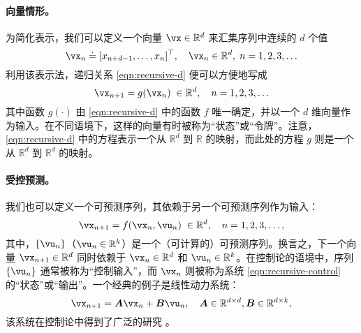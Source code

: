\documentclass[../../book-main_zh.tex]{subfiles}
\begin{document}
\paragraph{向量情形。} 
为简化表示，我们可以定义一个向量 $\vx \in \mathbb{R}^d$ 来汇集序列中连续的 $d$ 个值
\begin{equation}
    \vx_n \doteq [x_{n+d-1}, \ldots,  x_{n}]^\top, \quad \vx_n \in \mathbb{R}^d, \; n = 1, 2, 3, \ldots
\end{equation}
利用该表示法，递归关系 \eqref{eqn:recursive-d} 便可以方便地写成
\begin{equation}
    \vx_{n+1} = g(\vx_{n}) \; \in \mathbb{R}^d, \quad n =  1, 2, 3, \ldots
    \label{eqn:recursive-v}
\end{equation}
其中函数 $g(\cdot)$ 由 \eqref{eqn:recursive-d} 中的函数 $f$ 唯一确定，并以一个 $d$ 维向量作为输入。在不同语境下，这样的向量有时被称为“状态”或“令牌”。注意，\eqref{eqn:recursive-d} 中的方程表示一个从 $\mathbb{R}^d$ 到 $\mathbb{R}$ 的映射，而此处的方程 $g$ 则是一个从 $\mathbb{R}^d$ 到 $\mathbb{R}^d$ 的映射。


\paragraph{受控预测。}
我们也可以定义一个可预测序列，其依赖于另一个可预测序列作为输入：
\begin{equation}
    \vx_{n+1} = f(\vx_{n}, \vu_n) \; \in \mathbb{R}^d, \quad n =  1, 2, 3, \ldots,
\label{eqn:recursive-control}
\end{equation}
其中，$\{\vu_n\}$（$\vu_n \in \mathbb{R}^k$）是一个（可计算的）可预测序列。换言之，下一个向量 $\vx_{n+1} \in \mathbb{R}^d$ 同时依赖于 $\vx_n \in \mathbb{R}^d$ 和 $\vu_n \in \mathbb{R}^k$。在控制论的语境中，序列 $\{\vu_n\}$ 通常被称为“控制输入”，而 $\vx_n$ 则被称为系统 \eqref{eqn:recursive-control} 的“状态”或“输出”。一个经典的例子是线性动力系统：
\begin{equation}
    \vx_{n+1} = \boldsymbol{A}\vx_n + \boldsymbol{B}\vu_n, \quad \boldsymbol{A} \in \mathbb{R}^{d\times d}, \boldsymbol{B} \in \mathbb{R}^{d\times k},
    \label{eqn:lineary-system} 
\end{equation}
该系统在控制论中得到了广泛的研究 \cite{Cal:Des}。
\end{document}
